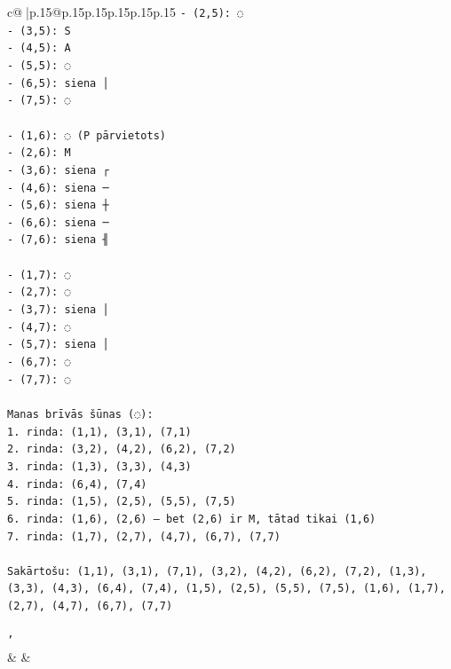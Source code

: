 \documentclass{article}
\begin{document}
{\begin{supertabular}{c@{$\;$}|p{.15\linewidth}@{}p{.15\linewidth}p{.15\linewidth}p{.15\linewidth}p{.15\linewidth}p{.15\linewidth}}
{{{\texttt{{-} (2,5): ◌} \\
\texttt{{-} (3,5): S} \\
\texttt{{-} (4,5): A} \\
\texttt{{-} (5,5): ◌} \\
\texttt{{-} (6,5): siena │} \\
\texttt{{-} (7,5): ◌} \\
\\ 
\texttt{{-} (1,6): ◌ (P pārvietots)} \\
\texttt{{-} (2,6): M} \\
\texttt{{-} (3,6): siena ┌} \\
\texttt{{-} (4,6): siena ─} \\
\texttt{{-} (5,6): siena ┼} \\
\texttt{{-} (6,6): siena ─} \\
\texttt{{-} (7,6): siena ╢} \\
\\ 
\texttt{{-} (1,7): ◌} \\
\texttt{{-} (2,7): ◌} \\
\texttt{{-} (3,7): siena │} \\
\texttt{{-} (4,7): ◌} \\
\texttt{{-} (5,7): siena │} \\
\texttt{{-} (6,7): ◌} \\
\texttt{{-} (7,7): ◌} \\
\\ 
\texttt{Manas brīvās šūnas (◌):} \\
\texttt{1. rinda: (1,1), (3,1), (7,1)} \\
\texttt{2. rinda: (3,2), (4,2), (6,2), (7,2)} \\
\texttt{3. rinda: (1,3), (3,3), (4,3)} \\
\texttt{4. rinda: (6,4), (7,4)} \\
\texttt{5. rinda: (1,5), (2,5), (5,5), (7,5)} \\
\texttt{6. rinda: (1,6), (2,6) — bet (2,6) ir M, tātad tikai (1,6)} \\
\texttt{7. rinda: (1,7), (2,7), (4,7), (6,7), (7,7)} \\
\\ 
\texttt{Sakārtošu: (1,1), (3,1), (7,1), (3,2), (4,2), (6,2), (7,2), (1,3), (3,3), (4,3), (6,4), (7,4), (1,5), (2,5), (5,5), (7,5), (1,6), (1,7), (2,7), (4,7), (6,7), (7,7)} \\
\\ 
\texttt{'} \\
            }
        }
    }
    & & \\ \\


\end{supertabular}}
\end{document}
